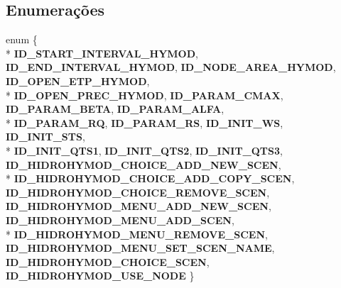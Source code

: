 \subsection*{Enumerações}
\begin{DoxyCompactItemize}
\item 
enum \{ \\*
{\bf I\+D\+\_\+\+S\+T\+A\+R\+T\+\_\+\+I\+N\+T\+E\+R\+V\+A\+L\+\_\+\+H\+Y\+M\+OD}, 
{\bf I\+D\+\_\+\+E\+N\+D\+\_\+\+I\+N\+T\+E\+R\+V\+A\+L\+\_\+\+H\+Y\+M\+OD}, 
{\bf I\+D\+\_\+\+N\+O\+D\+E\+\_\+\+A\+R\+E\+A\+\_\+\+H\+Y\+M\+OD}, 
{\bf I\+D\+\_\+\+O\+P\+E\+N\+\_\+\+E\+T\+P\+\_\+\+H\+Y\+M\+OD}, 
\\*
{\bf I\+D\+\_\+\+O\+P\+E\+N\+\_\+\+P\+R\+E\+C\+\_\+\+H\+Y\+M\+OD}, 
{\bf I\+D\+\_\+\+P\+A\+R\+A\+M\+\_\+\+C\+M\+AX}, 
{\bf I\+D\+\_\+\+P\+A\+R\+A\+M\+\_\+\+B\+E\+TA}, 
{\bf I\+D\+\_\+\+P\+A\+R\+A\+M\+\_\+\+A\+L\+FA}, 
\\*
{\bf I\+D\+\_\+\+P\+A\+R\+A\+M\+\_\+\+RQ}, 
{\bf I\+D\+\_\+\+P\+A\+R\+A\+M\+\_\+\+RS}, 
{\bf I\+D\+\_\+\+I\+N\+I\+T\+\_\+\+WS}, 
{\bf I\+D\+\_\+\+I\+N\+I\+T\+\_\+\+S\+TS}, 
\\*
{\bf I\+D\+\_\+\+I\+N\+I\+T\+\_\+\+Q\+T\+S1}, 
{\bf I\+D\+\_\+\+I\+N\+I\+T\+\_\+\+Q\+T\+S2}, 
{\bf I\+D\+\_\+\+I\+N\+I\+T\+\_\+\+Q\+T\+S3}, 
{\bf I\+D\+\_\+\+H\+I\+D\+R\+O\+H\+Y\+M\+O\+D\+\_\+\+C\+H\+O\+I\+C\+E\+\_\+\+A\+D\+D\+\_\+\+N\+E\+W\+\_\+\+S\+C\+EN}, 
\\*
{\bf I\+D\+\_\+\+H\+I\+D\+R\+O\+H\+Y\+M\+O\+D\+\_\+\+C\+H\+O\+I\+C\+E\+\_\+\+A\+D\+D\+\_\+\+C\+O\+P\+Y\+\_\+\+S\+C\+EN}, 
{\bf I\+D\+\_\+\+H\+I\+D\+R\+O\+H\+Y\+M\+O\+D\+\_\+\+C\+H\+O\+I\+C\+E\+\_\+\+R\+E\+M\+O\+V\+E\+\_\+\+S\+C\+EN}, 
{\bf I\+D\+\_\+\+H\+I\+D\+R\+O\+H\+Y\+M\+O\+D\+\_\+\+M\+E\+N\+U\+\_\+\+A\+D\+D\+\_\+\+N\+E\+W\+\_\+\+S\+C\+EN}, 
{\bf I\+D\+\_\+\+H\+I\+D\+R\+O\+H\+Y\+M\+O\+D\+\_\+\+M\+E\+N\+U\+\_\+\+A\+D\+D\+\_\+\+S\+C\+EN}, 
\\*
{\bf I\+D\+\_\+\+H\+I\+D\+R\+O\+H\+Y\+M\+O\+D\+\_\+\+M\+E\+N\+U\+\_\+\+R\+E\+M\+O\+V\+E\+\_\+\+S\+C\+EN}, 
{\bf I\+D\+\_\+\+H\+I\+D\+R\+O\+H\+Y\+M\+O\+D\+\_\+\+M\+E\+N\+U\+\_\+\+S\+E\+T\+\_\+\+S\+C\+E\+N\+\_\+\+N\+A\+ME}, 
{\bf I\+D\+\_\+\+H\+I\+D\+R\+O\+H\+Y\+M\+O\+D\+\_\+\+C\+H\+O\+I\+C\+E\+\_\+\+S\+C\+EN}, 
{\bf I\+D\+\_\+\+H\+I\+D\+R\+O\+H\+Y\+M\+O\+D\+\_\+\+U\+S\+E\+\_\+\+N\+O\+DE}
 \}
\end{DoxyCompactItemize}
